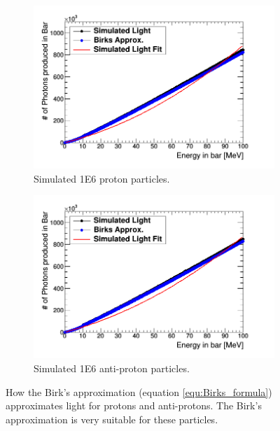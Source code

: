 \begin{figure}[htbp]
\centering
\begin{subfigure}{.5\textwidth}
  \centering
  \includegraphics[width=\linewidth]{Appendix5/Figs/light_of_protons0-100mev.png}
  \captionsetup{width=.9\linewidth}
  \caption{Simulated 1E6 proton particles.}
  \label{subfig:append5_light_of_protons0-100mev}
\end{subfigure}%
\begin{subfigure}{.5\textwidth}
  \centering
  \includegraphics[width=\linewidth]{Appendix5/Figs/light_of_Aprotons0-100mev.png}
  \captionsetup{width=.9\linewidth}
  \caption{Simulated 1E6 anti-proton particles.}
  \label{subfig:append5_light_of_Aprotons0-100mev}
\end{subfigure}
\caption{How the Birk's approximation (equation \ref{equ:Birks_formula}) approximates light for protons and anti-protons. The Birk's approximation is very suitable for these particles.}
\label{fig:append5_light_of_protons_Aprotons0-100mev}
\end{figure}


